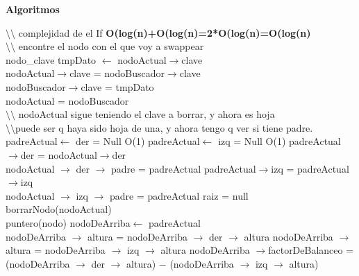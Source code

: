 \documentclass[a4paper,10pt]{article}
\newenvironment{Algoritmos}{%
  \vspace*{2ex}%
  \noindent\textbf{\Large Algoritmos}%
  \vspace*{2ex}%
}{}
\begin{document}
\begin{Algoritmos}
\newpage
\begin{algorithm}[H]
    {$\setminus$$\setminus$ complejidad de el If \textbf{O(log(n)+O(log(n)=2*O(log(n)=O(log(n)} \\
    $\setminus$$\setminus$ encontre el nodo con el que voy a swappear \\}
    {nodo\_clave tmpDato $\leftarrow$ nodoActual$\rightarrow$clave\\}
    {nodoActual$\rightarrow$clave = nodoBuscador$\rightarrow$clave \\}
    {nodoBuscador$\rightarrow$clave = tmpDato\\}
    {nodoActual = nodoBuscador\\}
    {$\setminus$$\setminus$ nodoActual sigue teniendo el clave a borrar, y ahora es hoja\\}
    {
    {$\setminus$$\setminus$puede ser q haya sido hoja de una, y ahora tengo q ver si tiene          padre.\\
    {
    {padreActual$\leftarrow$ der = Null \hfill O(1)}
    {padreActual$\leftarrow$ izq = Null \hfill O(1)}
    }
    {}
    }
    {
    {padreActual$\rightarrow$der = nodoActual$\rightarrow$der\\
    nodoActual $\rightarrow$ der $\rightarrow$ padre = padreActual}
    {padreActual$\rightarrow$izq = padreActual$\rightarrow$izq\\
    nodoActual $\rightarrow$ izq $\rightarrow$ padre = padreActual}
    }
    {
    {raiz = null}
    {}
    }
    {borrarNodo(nodoActual)\\}
    {puntero(nodo) nodoDeArriba$\leftarrow$ padreActual\\}
    {
    {
    {nodoDeArriba $\rightarrow$ altura = nodoDeArriba $\rightarrow$ der $\rightarrow$ altura}
    {nodoDeArriba $\rightarrow$ altura = nodoDeArriba $\rightarrow$ izq $\rightarrow$ altura}
    {nodoDeArriba $\rightarrow$factorDeBalanceo = (nodoDeArriba $\rightarrow$ der $\rightarrow$ altura) $-$ (nodoDeArriba $\rightarrow$ izq $\rightarrow$ altura)}
    }
}}
\end{algorithm}
\end{Algoritmos}
\end{document}
